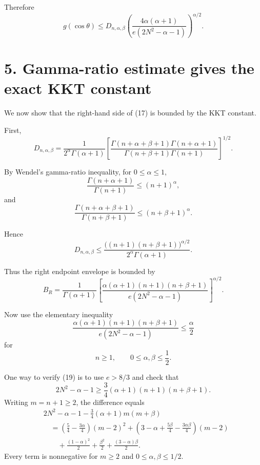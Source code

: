 \documentclass[11pt]{article}
\begin{document}
Therefore
\begin{equation}
g(\cos\theta)
\le
D_{n,\alpha,\beta}
\left(
\frac{4\alpha(\alpha+1)}
{e(2N^2-\alpha-1)}
\right)^{\alpha/2}.
\tag{17}
\end{equation}

\section*{5. Gamma-ratio estimate gives the exact KKT constant}

We now show that the right-hand side of (17) is bounded by the KKT constant.

First,
\begin{equation*}
D_{n,\alpha,\beta}
=
\frac{1}{2^\alpha\Gamma(\alpha+1)}
\left[
\frac{\Gamma(n+\alpha+\beta+1)\Gamma(n+\alpha+1)}
{\Gamma(n+\beta+1)\Gamma(n+1)}
\right]^{1/2}.
\end{equation*}

By Wendel's gamma-ratio inequality, for \(0\le\alpha\le1\),
\begin{equation*}
\frac{\Gamma(n+\alpha+1)}{\Gamma(n+1)}
\le
(n+1)^\alpha,
\end{equation*}
and
\begin{equation*}
\frac{\Gamma(n+\alpha+\beta+1)}{\Gamma(n+\beta+1)}
\le
(n+\beta+1)^\alpha.
\end{equation*}

Hence
\begin{equation*}
D_{n,\alpha,\beta}
\le
\frac{\bigl((n+1)(n+\beta+1)\bigr)^{\alpha/2}}
{2^\alpha\Gamma(\alpha+1)}.
\end{equation*}

Thus the right endpoint envelope is bounded by
\begin{equation}
B_R
=
\frac{1}{\Gamma(\alpha+1)}
\left[
\frac{\alpha(\alpha+1)(n+1)(n+\beta+1)}
{e(2N^2-\alpha-1)}
\right]^{\alpha/2}.
\tag{18}
\end{equation}

Now use the elementary inequality
\begin{equation}
\boxed{
\frac{\alpha(\alpha+1)(n+1)(n+\beta+1)}
{e(2N^2-\alpha-1)}
\le
\frac{\alpha}{2}
}
\tag{19}
\end{equation}
for
\begin{equation*}
n\ge1,\qquad 0\le\alpha,\beta\le\frac12.
\end{equation*}

One way to verify (19) is to use \(e>8/3\) and check that
\begin{equation*}
2N^2-\alpha-1
\ge
\frac34(\alpha+1)(n+1)(n+\beta+1).
\end{equation*}
Writing \(m=n+1\ge2\), the difference equals
\begin{align*}
&2N^2-\alpha-1
-\frac34(\alpha+1)m(m+\beta) \\
&\quad =
\left(\frac54-\frac{3\alpha}{4}\right)(m-2)^2
+
\left(3-\alpha+\frac{5\beta}{4}-\frac{3\alpha\beta}{4}\right)(m-2) \\
&\qquad
+
\frac{(1-\alpha)^2}{2}
+
\frac{\beta^2}{2}
+
\frac{(3-\alpha)\beta}{2}.
\end{align*}
Every term is nonnegative for \(m\ge2\) and \(0\le\alpha,\beta\le1/2\).
\end{document}
